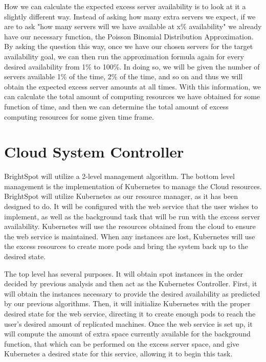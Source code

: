 \documentclass[thesis,proposal]{umassthesis}  %
\begin{document}
How we can calculate the expected excess server availability is to look at it a slightly different way. Instead of asking how many extra servers we expect, if we are to ask "how many servers will we have available at x\% availability" we already have our necessary function, the Poisson Binomial Distribution Approximation. By asking the question this way, once we have our chosen servers for the target availability goal, we can then run the approximation formula again for every desired availability from 1\% to 100\%. In doing so, we will be given the number of servers available 1\% of the time, 2\% of the time, and so on and thus we will obtain the expected excess server amounts at all times. With this information, we can calculate the total amount of computing resources we have obtained for some function of time, and then we can determine the total amount of excess computing resources for some given time frame.\par





\section{Cloud System Controller}

BrightSpot will utilize a 2-level management algorithm. The bottom level management is the implementation of Kubernetes to manage the Cloud resources. BrightSpot will utilize Kubernetes as our resource manager, as it has been designed to do. It will be configured with the web service that the user wishes to implement, as well as the background task that will be run with the excess server availability. Kubernetes will use the resources obtained from the cloud to ensure the web service is maintained. When any instances are lost, Kubernetes will use the excess resources to create more pods and bring the system back up to the desired state.\par

The top level has several purposes. It will obtain spot instances in the order decided by previous analysis and then act as the Kubernetes Controller. First, it will obtain the instances necessary to provide the desired availability as predicted by our previous algorithms. Then, it will initialize Kubernetes with the proper desired state for the web service, directing it to create enough pods to reach the user's desired amount of replicated machines. Once the web service is set up, it will compute the amount of extra space currently available for the background function, that which can be performed on the excess server space, and give Kubernetes a desired state for this service, allowing it to begin this task.\par
\end{document}
